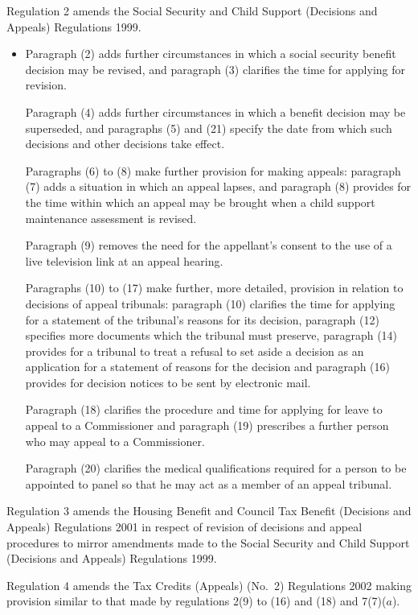 \documentclass[12pt,a4paper]{article}
\begin{document}
Regulation 2 amends the Social Security and Child Support (Decisions and Appeals) Regulations 1999.
\begin{itemize}\item[]
    Paragraph (2) adds further circumstances in which a social security benefit decision may be revised, and paragraph (3) clarifies the time for applying for revision.

    Paragraph (4) adds further circumstances in which a benefit decision may be superseded, and paragraphs (5) and (21) specify the date from which such decisions and other decisions take effect.

    Paragraphs (6) to (8) make further provision for making appeals: paragraph (7) adds a situation in which an appeal lapses, and paragraph (8) provides for the time within which an appeal may be brought when a child support maintenance assessment is revised.

    Paragraph (9) removes the need for the appellant’s consent to the use of a live television link at an appeal hearing.

    Paragraphs (10) to (17) make further, more detailed, provision in relation to decisions of appeal tribunals: paragraph (10) clarifies the time for applying for a statement of the tribunal’s reasons for its decision, paragraph (12) specifies more documents which the tribunal must preserve, paragraph (14) provides for a tribunal to treat a refusal to set aside a decision as an application for a statement of reasons for the decision and paragraph (16) provides for decision notices to be sent by electronic mail.

    Paragraph (18) clarifies the procedure and time for applying for leave to appeal to a Commissioner and paragraph (19) prescribes a further person who may appeal to a Commissioner.

    Paragraph (20) clarifies the medical qualifications required for a person to be appointed to panel so that he may act as a member of an appeal tribunal. 
\end{itemize}

Regulation 3 amends the Housing Benefit and Council Tax Benefit (Decisions and Appeals) Regulations 2001 in respect of revision of decisions and appeal procedures to mirror amendments made to the Social Security and Child Support (Decisions and Appeals) Regulations 1999.

Regulation 4 amends the Tax Credits (Appeals) (No.\ 2) Regulations 2002 making provision similar to that made by regulations 2(9) to (16) and (18) and 7(7)($a$).
\end{document}
